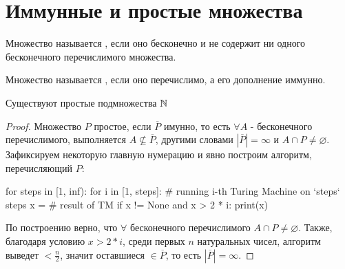 \section{Иммунные и простые множества}

\begin{defn}
    Множество называется , если оно бесконечно и не содержит ни одного бесконечного перечислимого множества.
\end{defn}

\begin{defn}
    Множество называется , если оно перечислимо, а его дополнение иммунно.
\end{defn}

\begin{thm}
    Существуют простые подмножества $ \mathbb{N}$
\end{thm}
\begin{proof}
    Множество $ P$ простое, если $ \overline P$ имунно, то есть $ \forall A$ - бесконечного перечислимого, выполняется $ A \nsubseteq \overline P$, другими словами $ |\overline P| = \infty$ и $ A \cap P \neq \varnothing$. \\
    Зафиксируем некоторую главную нумерацию и явно построим алгоритм, перечисляющий $ P$:
    
    \begin{python}
for steps in [1, inf):
    for i in [1, steps]:
        # running i-th Turing Machine on `steps` steps
        x = # result of TM
        if x != None and x > 2 * i:
            print(x)
\end{python}

  \par По построению верно, что $ \forall$ бесконечного перечислимого $ A \cap P \neq \varnothing$. Также, благодаря условию $ x > 2 * i$, среди первых $ n$ натуральных чисел, алгоритм выведет $ < \frac{n}{2}$, значит оставшиеся $ \in \overline P$, то есть $ |\overline P| = \infty$.
\end{proof}

